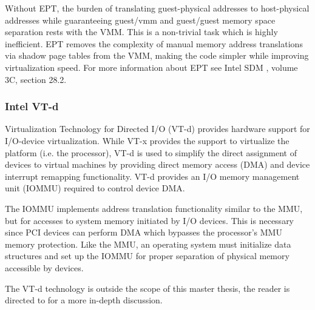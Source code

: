 Without EPT, the burden of translating guest-physical addresses to
host-physical addresses while guaranteeing guest/vmm and guest/guest memory
space separation rests with the VMM. This is a non-trivial task which is highly
inefficient. EPT removes the complexity of manual memory address translations
via shadow page tables from the VMM, making the code simpler while improving
virtualization speed. For more information about EPT see Intel SDM
\cite{IntelSDM}, volume 3C, section 28.2.

\subsubsection{Intel VT-d}\label{subsubsec:vtd}
Virtualization Technology for Directed I/O (VT-d) provides hardware
support for I/O-device virtualization. While VT-x provides the support to
virtualize the platform (i.e. the processor), VT-d is used to simplify the
direct assignment of devices to virtual machines by providing direct memory
access (DMA) and device interrupt remapping functionality. VT-d
provides an I/O memory management unit (IOMMU) required to control
device DMA.

The IOMMU implements address translation functionality similar to the MMU, but
for accesses to system memory initiated by I/O devices.  This is necessary
since PCI devices can perform DMA which bypasses the processor's MMU memory
protection. Like the MMU, an operating system must initialize data structures
and set up the IOMMU for proper separation of physical memory accessible by
devices.

The VT-d technology is outside the scope of this master thesis, the reader is
directed to \cite{IntelVTd} for a more in-depth discussion.
